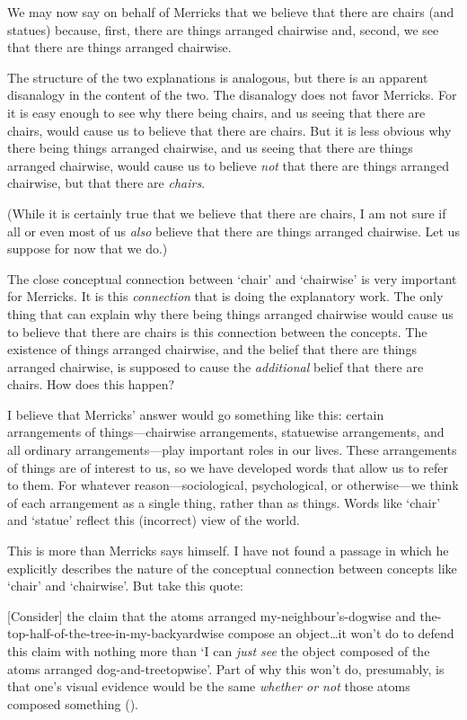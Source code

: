 \documentclass[11pt]{article}
\newenvironment{squote}{%
\begin{spacing}{1}
       	\begin{list}{}{%
\setlength{\labelwidth}{0pt}%
\rightmargin\leftmargin%
}
\item\relax
}{%
\end{list}%
\end{spacing}
}
\begin{document}
\begin{spacing}{1.25}
We may now say on behalf of Merricks that we believe that there are
chairs (and statues) because, first, there are things arranged
chairwise and, second, we see that there are things arranged
chairwise.

The structure of the two explanations is analogous, but there is an
apparent disanalogy in the content of the two.  The disanalogy does
not favor Merricks.  For it is easy enough to see why there being
chairs, and us seeing that there are chairs, would cause us to believe
that there are chairs.  But it is less obvious why there being things
arranged chairwise, and us seeing that there are things arranged
chairwise, would cause us to believe {\em not} that there are things
arranged chairwise, but that there are {\em chairs}.

(While it is certainly true that we believe that there are chairs, I
am not sure if all or even most of us {\em also} believe that there
are things arranged chairwise.  Let us suppose for now that we do.)

The close conceptual connection between `chair' and `chairwise' is
very important for Merricks.  It is this {\em connection} that is
doing the explanatory work.  The only thing that can explain why there
being things arranged chairwise would cause us to believe that there
are chairs is this connection between the concepts.  The existence of
things arranged chairwise, and the belief that there are things
arranged chairwise, is supposed to cause the {\em additional} belief
that there are chairs.  How does this happen?

I believe that Merricks' answer would go something like this: certain
arrangements of things---chairwise arrangements, statuewise
arrangements, and all ordinary arrangements---play important roles in
our lives.  These arrangements of things are of interest to us, so we
have developed words that allow us to refer to them.  For whatever
reason---sociological, psychological, or otherwise---we think of each
arrangement as a single thing, rather than as things.  Words like
`chair' and `statue' reflect this (incorrect) view of the world.

This is more than Merricks says himself.  I have not found a passage
in which he explicitly describes the nature of the conceptual
connection between concepts like `chair' and `chairwise'.  But take
this quote:

\begin{squote}
{[}Consider{]} the claim that the atoms arranged my-neighbour's-dogwise
and the-top-half-of-the-tree-in-my-backyardwise compose an
object\ldots{}it won't do to defend this claim with nothing more than `I
can \emph{just see} the object composed of the atoms arranged
dog-and-treetopwise'. Part of why this won't do, presumably, is that
one's visual evidence would be the same \emph{whether or not} those
atoms composed something (\citeyear[8--9]{merricks2001a}).
\end{squote}


\end{spacing}
\end{document}
